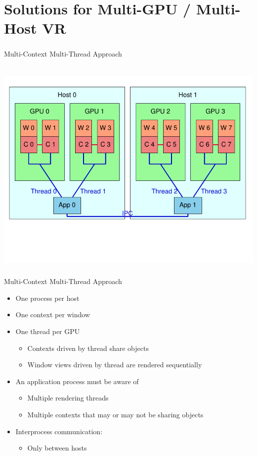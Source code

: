 \documentclass[utf8,stillsansserifmath,fleqn,t]{beamer}
\begin{document}
\section{Solutions for Multi-GPU / Multi-Host VR}

\begin{frame}
\frametitle{\insertsection}
\centerline{Multi-Context Multi-Thread Approach}~\\
\includegraphics[height=.75\textheight]{./fig/setup-vr-mcmt.pdf}
\end{frame}

\begin{frame}
\frametitle{\insertsection}
Multi-Context Multi-Thread Approach
\begin{itemize}
\item One process per host
\item One context per window
\item One thread per GPU
    \begin{itemize}
    \item Contexts driven by thread share objects
    \item Window views driven by thread are rendered sequentially
    \end{itemize}
\item An application process must be aware of
    \begin{itemize}
    \item Multiple rendering threads
    \item Multiple contexts that may or may not be sharing objects
    \end{itemize}
\item Interprocess communication:
    \begin{itemize}
    \item Only between hosts
    \end{itemize}
\end{itemize}
\end{frame}
\end{document}
